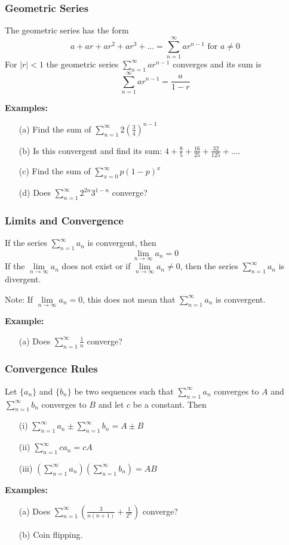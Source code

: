 \documentclass{beamer}
\begin{document}
\begin{frame}
\frametitle{Geometric Series}
The geometric series has the form
$$a + ar + ar^2 + ar^3 +... = \sum_{n=1}^\infty ar^{n-1} \mbox{ for } a\neq 0$$
For $|r|<1$ the geometric series $\sum_{n=1}^\infty ar^{n-1}$ converges and its sum is 
$$\sum_{n=1}^\infty ar^{n-1} =\frac{a}{1-r}$$

\vspace{6pt}
\textbf{Examples:}
\begin{itemize}
	\item[(a)] Find the sum of $\sum_{n=1}^\infty 2(\frac{3}{4})^{n-1}$
	\item[(b)] Is this convergent and find its sum: $4+\frac{8}{5} + \frac{16}{25} + \frac{32}{125} + ...$.
	\item[(c)] Find the sum of $\sum_{x=0}^\infty p(1-p)^x$
	\item[(d)] Does $\sum_{n=1}^\infty 2^{2n} 3^{1-n}$ converge?
\end{itemize}
\end{frame}

\begin{frame}
\frametitle{Limits and Convergence}

\begin{theorem}
	If the series $\sum_{n=1}^\infty a_n$ is convergent, then 
	$$\lim\limits_{n \to \infty} a_n = 0$$
	If the $\lim\limits_{n \to \infty} a_n$ does not exist or if $\lim\limits_{n \to \infty} a_n \neq 0$, then the series $\sum_{n=1}^\infty a_n$  is divergent.
\end{theorem}
Note: If $\lim\limits_{n\to \infty} a_n = 0$, this does not mean that $\sum_{n=1}^\infty a_n$ is convergent.

\vspace{12pt}
\textbf{Example:}
\begin{itemize}
	\item[(a)] Does $\sum_{n=1}^\infty \frac{1}{n}$ converge?
\end{itemize}
\end{frame}

\begin{frame}
\frametitle{Convergence Rules}
Let $\{a_n\}$ and $\{b_n\}$ be two sequences such that $\sum_{n=1}^\infty a_n$ converges to $A$ and $\sum_{n=1}^\infty b_n$ converges to $B$ and let $c$ be a constant. Then
\begin{itemize}
	\item[(i)] $\sum_{n=1}^\infty a_n \pm  \sum_{n=1}^\infty b_n = A \pm B$
	\item[(ii)] $\sum_{n=1}^\infty c a_n = cA$
	\item[(iii)] $(\sum_{n=1}^\infty a_n )(\sum_{n=1}^\infty b_n ) = AB$
\end{itemize}
\vspace{12pt}
\textbf{Examples:}
\begin{itemize}
	\item[(a)] Does $\sum_{n=1}^{\infty} (\frac{3}{n(n+1)} + \frac{1}{2^n})$ converge?
	\item[(b)] Coin flipping.
\end{itemize}
\end{frame}
\end{document}
